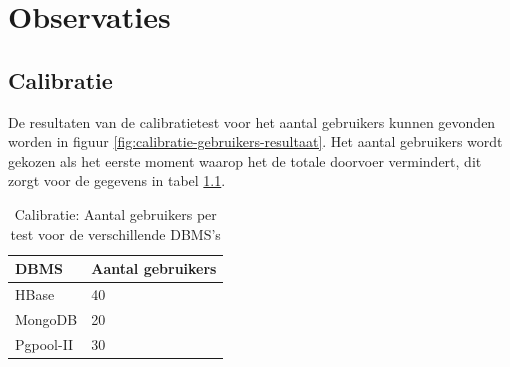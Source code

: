 \chapter{Observaties}

\section{Calibratie}
De resultaten van de calibratietest voor het aantal gebruikers kunnen gevonden worden in figuur \ref{fig:calibratie-gebruikers-resultaat}. Het aantal gebruikers wordt gekozen als het eerste moment waarop het de totale doorvoer vermindert, dit zorgt voor de gegevens in tabel \ref{table:calibratie-gebruikers-resultaat}. 

\begin{table}[h!]
	\centering
	\begin{tabular}{l| l }
		\textbf{DBMS} & Aantal gebruikers \\
		\hline
		HBase & 40 \\
		MongoDB & 20\\
		Pgpool-II & 30\\
	\end{tabular}
	\caption{Calibratie: Aantal gebruikers per test voor de verschillende DBMS's}
	\label{table:calibratie-gebruikers-resultaat}
\end{table}

